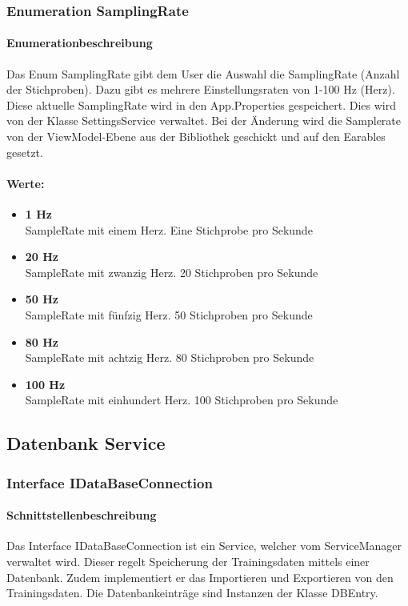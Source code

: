 \documentclass[a4paper,12pt]{article}
\begin{document}
\subsubsection{Enumeration SamplingRate}
	\paragraph{Enumerationbeschreibung}
	Das Enum SamplingRate gibt dem User die Auswahl die SamplingRate (Anzahl der Stichproben). Dazu gibt es mehrere Einstellungsraten von 1-100 Hz (Herz). Diese aktuelle SamplingRate wird in den App.Properties gespeichert. Dies wird von der Klasse SettingsService verwaltet. 
	Bei der Änderung wird die Samplerate von der ViewModel-Ebene aus der Bibliothek geschickt und auf den \Gls{Earables} gesetzt.
	
	\paragraph{Werte:}
	\begin{itemize}
		\item \textbf{1 Hz}\\SampleRate mit einem Herz. Eine Stichprobe pro Sekunde
		\item \textbf{20 Hz}\\SampleRate mit zwanzig Herz. 20 Stichproben pro Sekunde
		\item \textbf{50 Hz}\\SampleRate mit fünfzig Herz. 50 Stichproben pro Sekunde
		\item \textbf{80 Hz}\\SampleRate mit achtzig Herz. 80 Stichproben pro Sekunde
		\item \textbf{100 Hz}\\SampleRate mit einhundert Herz. 100 Stichproben pro Sekunde
	\end{itemize}
	
	
	
	
	
	
	
\subsection{Datenbank Service}
\subsubsection{Interface IDataBaseConnection}
	\paragraph{Schnittstellenbeschreibung}
	Das Interface IDataBaseConnection ist ein Service, welcher vom ServiceManager verwaltet wird. Dieser regelt Speicherung der Trainingsdaten mittels einer \gls{Datenbank}. Zudem implementiert er das Importieren und Exportieren von den Trainingsdaten.
	Die Datenbankeinträge sind Instanzen der Klasse DBEntry. 
	
\end{document}
